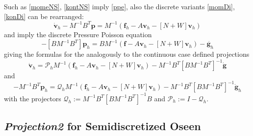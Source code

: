 \documentclass[a4paper,10pt,BCOR=15mm]{scrbook}
\begin{document}
Such as \eqref{momeNS}, \eqref{kontNS} imply \eqref{ppe}, also the discrete variants \eqref{momDi}, \eqref{konDi} can be rearranged:
\begin{equation*}
 \dot {\mathbf v}_h -  M^{-1} B^T \mathbf p    = M^{-1}( \mathbf f_h - A \mathbf v_h-[N+W]\mathbf v_h)
\end{equation*}
and imply the discrete Pressure Poisson equation
\begin{equation*}
 -[BM^{-1}B^T]\mathbf p_h=BM^{-1}(\mathbf f-A \mathbf v_h-[N+W]\mathbf v_h)-\dot {\mathbf g_h}
\end{equation*}
giving the formulas for the analogously to the continuous case defined projections 
\begin{equation*}
 \dot {\mathbf v}_h = \mathscr P_h M^{-1}(\mathbf f_h-A\mathbf v_h-[N+W]\mathbf v_h)-M^{-1} B^T  [BM^{-1}B^T]^{-1} \dot {\mathbf g}
\end{equation*}
and
\begin{equation*}
 -M^{-1}B^T\mathbf p_h = \mathscr Q_h M^{-1}(\mathbf f_h-A \mathbf v_h-[N+W]\mathbf v_h)-M^{-1} B^T  [BM^{-1}B^T]^{-1} \dot {\mathbf g}_h
\end{equation*}
with the projectors $\mathscr Q _h:=M^{-1} B^T  [BM^{-1}B^T]^{-1}B$ and $\mathscr P _h := I- \mathscr Q _h$.


\subsection{\textit{Projection2} for Semidiscretized Oseen}\label{p2fos}
\end{document}
